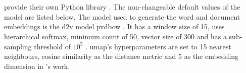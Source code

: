 \section{\topTwovec{}}\label{sec:impl-top2vec}

\citeauthor{Top2Vec2020} provide their own Python library \topTwovec{} \cite{Top2Vec2020}.
The non-changeable default values of the model are listed below.
The model used to generate the word and document embeddings is the \ac{d2v} model \ac{pvdbow} \topTwovec{} \cite{Top2Vec2020}.
It has a window size of 15, uses hierarchical softmax, minimum count of 50, vector size of 300 and has a sub-sampling threshold of $10^5$ \cite{Top2Vec2020}.
\ac{umap}'s hyperparameters are set to 15 nearest neighbours, cosine similarity as the distance metric and 5 as the embedding dimension in \citeauthor{Top2Vec2020}'s work.

